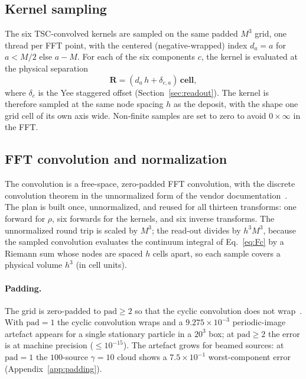 \subsection{Kernel sampling}

The six TSC-convolved kernels are sampled on the same padded $M^3$ grid, one
thread per FFT point, with the centered (negative-wrapped) index
$d_a = a$ for $a<M/2$ else $a-M$. For each of the six components $c$, the
kernel is evaluated at the physical separation
\begin{equation}
\mathbf{R} = (d_a\,h + \delta_{c,a})\,\mathbf{cell},
\end{equation}
where $\delta_c$ is the Yee staggered offset (Section~\ref{sec:readout}).
The kernel is therefore sampled at the same node spacing $h$ as the deposit,
with the shape one grid cell of its own axis wide. Non-finite samples are
set to zero to avoid $0\times\infty$ in the FFT.

\subsection{FFT convolution and normalization}

The convolution is a free-space, zero-padded FFT convolution, with the
discrete convolution theorem in the unnormalized form of the vendor
documentation~\citep{press1986,cufft2024}. The plan is built once,
unnormalized, and reused for all thirteen transforms: one forward for
$\rho$, six forwards for the kernels, and six inverse transforms. The
unnormalized round trip is scaled by $M^3$; the read-out divides by
$h^3 M^3$, because the sampled convolution evaluates the continuum integral
of Eq.~\eqref{eq:Fc} by a Riemann sum whose nodes are spaced $h$ cells
apart, so each sample covers a physical volume $h^3$ (in cell units).

\paragraph{Padding.}
The grid is zero-padded to $\mathrm{pad}\ge 2$ so that the cyclic
convolution does not wrap~\citep{press1986}. With $\mathrm{pad}=1$ the
cyclic convolution wraps and a $9.275\times10^{-3}$ periodic-image artefact
appears for a single stationary particle in a $20^3$ box; at
$\mathrm{pad}\ge2$ the error is at machine precision
($\le 10^{-15}$). The artefact grows for beamed sources: at
$\mathrm{pad}=1$ the $100$-source $\gamma=10$ cloud shows a
$7.5\times10^{-1}$ worst-component error (Appendix~\ref{app:padding}).

